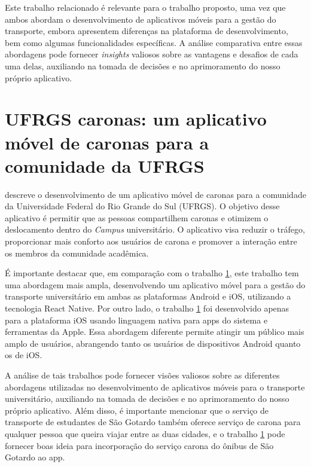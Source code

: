 \documentclass[
    12pt,                   %
    openright,              %
    oneside,                %
    a4paper,                %
    sumario=tradicional,    %
    english,                %
    brazil,                 %
    ]{abntex2}
\begin{document}
Este trabalho relacionado é relevante para o trabalho proposto, uma vez que ambos abordam o desenvolvimento de aplicativos móveis para a gestão do transporte, embora apresentem diferenças na plataforma de desenvolvimento, bem como algumas funcionalidades específicas. A análise comparativa entre essas abordagens pode fornecer  \textit{insights} valiosos sobre as vantagens e desafios de cada uma delas, auxiliando na tomada de decisões e no aprimoramento do nosso próprio aplicativo. 


\section{UFRGS caronas: um aplicativo móvel de caronas para a comunidade da UFRGS}
\label{sec:caronasufrgsboranga2019}

\cite{boranga2019ufrgs} descreve o desenvolvimento de um aplicativo móvel de caronas para a comunidade da Universidade Federal do Rio Grande do Sul (UFRGS). O objetivo desse aplicativo é permitir que as pessoas compartilhem caronas e otimizem o deslocamento dentro do \textit{Campus} universitário. O aplicativo visa reduzir o tráfego, proporcionar mais conforto aos usuários de carona e promover a interação entre os membros da comunidade acadêmica.

É importante destacar que, em comparação com o trabalho \ref{sec:caronasufrgsboranga2019}, este trabalho tem uma abordagem mais ampla, desenvolvendo um aplicativo móvel para a gestão do transporte universitário em ambas as plataformas Android e iOS, utilizando a tecnologia React Native. Por outro lado, o trabalho \ref{sec:caronasufrgsboranga2019} foi desenvolvido apenas para a plataforma iOS usando linguagem nativa para apps do sistema e ferramentas da Apple. Essa abordagem diferente permite atingir um público mais amplo de usuários, abrangendo tanto os usuários de dispositivos Android quanto os de iOS.

A análise de tais trabalhos pode fornecer visões valiosos sobre as diferentes abordagens utilizadas no desenvolvimento de aplicativos móveis para o transporte universitário, auxiliando na tomada de decisões e no aprimoramento do nosso próprio aplicativo. Além disso, é importante mencionar que o serviço de transporte de estudantes de São Gotardo também oferece serviço de carona para qualquer pessoa que queira viajar entre as duas cidades, e o trabalho \ref{sec:caronasufrgsboranga2019} pode fornecer boas ideia para incorporação do serviço carona do ônibus de São Gotardo ao app. 
\end{document}

